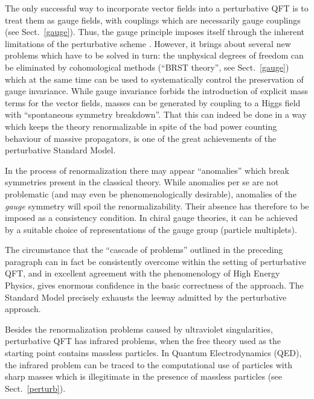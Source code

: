 \documentclass[multphys,vecphys]{svmult}
\begin{document}
The only successful way to incorporate vector fields into a
perturbative QFT is to treat them as gauge
fields, with couplings which are necessarily gauge couplings (see
Sect.~\ref{gauge}). Thus, the gauge principle  
imposes itself through the inherent limitations of the perturbative
scheme \cite{Sto}. However, it brings about several new problems which
have to be solved in turn: the unphysical degrees of freedom can be
eliminated by cohomological methods (``BRST
theory'', see Sect.~\ref{gauge}) which at the same time can be used to  
systematically control the preservation of gauge invariance. While
gauge invariance forbids the introduction of explicit mass terms for
the vector fields, masses can be generated by coupling to a
Higgs field with
``spontaneous symmetry
breakdown''. That this can indeed be done in a way which keeps the
theory renormalizable in spite of the bad
power counting behaviour of massive propagators,
is one of the great achievements of the perturbative Standard Model.   

In the process of renormalization there may
appear ``anomalies'' which break symmetries present
in the classical theory. While anomalies per se are not problematic
(and may even be phenomenologically desirable), anomalies of the {\em
  gauge} symmetry will spoil the renormalizability. Their absence has
therefore to be imposed as a consistency condition. In chiral gauge
theories, it can be achieved by a suitable choice of representations
of the gauge group (particle multiplets).  

The circumstance that the ``cascade of problems'' outlined in the
preceding paragraph can in fact be consistently overcome within the
setting of perturbative QFT, and in
excellent agreement with the phenomenology of High Energy Physics,
gives enormous confidence in the basic correctness of the
approach. The Standard Model precisely exhausts the leeway admitted by
the perturbative approach. 

Besides the renormalization problems caused by
ultraviolet singularities,
perturbative QFT has infrared problems, when
the free theory used as the starting point contains massless
particles. In Quantum Electrodynamics
(QED), the infrared problem can be traced to the
computational use of particles with sharp masses which is illegitimate
in the presence of massless particles (see Sect.~\ref{perturb}). 
\end{document}
